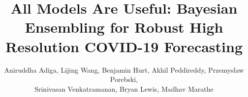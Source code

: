 \documentclass[sigconf]{acmart}
\begin{document}
\title{All Models Are Useful: Bayesian Ensembling for Robust High Resolution COVID-19 Forecasting}

\author{Aniruddha Adiga, Lijing Wang, Benjamin Hurt, Akhil Peddireddy, Przemyslaw Porebski, \\ Srinivasan Venkatramanan, Bryan Lewis, Madhav Marathe}







\end{document}
